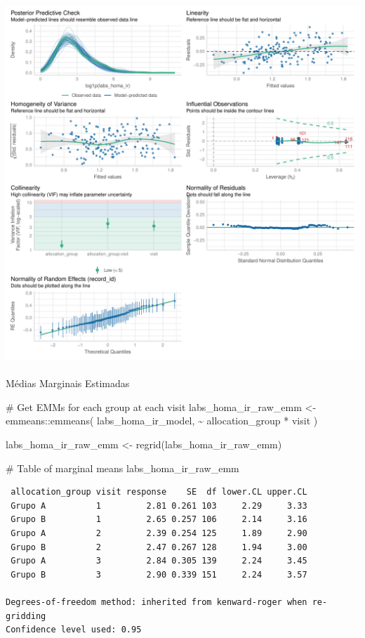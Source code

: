 \documentclass[
  letterpaper,
  DIV=11,
  numbers=noendperiod]{scrartcl}
\makeatletter
\let\oldparagraph\paragraph
\renewcommand{\paragraph}{
    \@ifstar
      \xxxParagraphStar
      \xxxParagraphNoStar
  }
\newcommand{\xxxParagraphStar}[1]{\oldparagraph*{#1}\mbox{}}
\newcommand{\xxxParagraphNoStar}[1]{\oldparagraph{#1}\mbox{}}
\newenvironment{Shaded}{\begin{snugshade}}{\end{snugshade}}
\newcommand{\CommentTok}[1]{\textcolor[rgb]{0.37,0.37,0.37}{#1}}
\newcommand{\FunctionTok}[1]{\textcolor[rgb]{0.28,0.35,0.67}{#1}}
\newcommand{\NormalTok}[1]{\textcolor[rgb]{0.00,0.23,0.31}{#1}}
\newcommand{\OtherTok}[1]{\textcolor[rgb]{0.00,0.23,0.31}{#1}}
\newcommand{\SpecialCharTok}[1]{\textcolor[rgb]{0.37,0.37,0.37}{#1}}
\makeatother
\begin{document}
\includegraphics{Outcomes_V1V2V3_files/figure-pdf/labs_homa_ir_4-2.pdf}

\paragraph{Médias Marginais
Estimadas}\label{muxe9dias-marginais-estimadas-11}

\begin{Shaded}
\begin{Highlighting}[]
\CommentTok{\# Get EMMs for each group at each visit}
\NormalTok{labs\_homa\_ir\_raw\_emm }\OtherTok{\textless{}{-}}\NormalTok{ emmeans}\SpecialCharTok{::}\FunctionTok{emmeans}\NormalTok{(}
\NormalTok{    labs\_homa\_ir\_model, }
    \SpecialCharTok{\textasciitilde{}}\NormalTok{ allocation\_group }\SpecialCharTok{*}\NormalTok{ visit}
\NormalTok{)}

\NormalTok{labs\_homa\_ir\_raw\_emm }\OtherTok{\textless{}{-}} \FunctionTok{regrid}\NormalTok{(labs\_homa\_ir\_raw\_emm)}

\CommentTok{\# Table of marginal means}
\NormalTok{labs\_homa\_ir\_raw\_emm}
\end{Highlighting}
\end{Shaded}

\begin{verbatim}
 allocation_group visit response    SE  df lower.CL upper.CL
 Grupo A          1         2.81 0.261 103     2.29     3.33
 Grupo B          1         2.65 0.257 106     2.14     3.16
 Grupo A          2         2.39 0.254 125     1.89     2.90
 Grupo B          2         2.47 0.267 128     1.94     3.00
 Grupo A          3         2.84 0.305 139     2.24     3.45
 Grupo B          3         2.90 0.339 151     2.24     3.57

Degrees-of-freedom method: inherited from kenward-roger when re-gridding 
Confidence level used: 0.95 
\end{verbatim}
\end{document}

